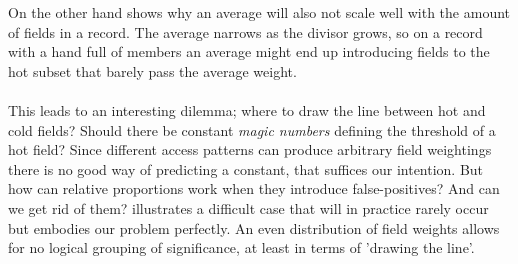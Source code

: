 On the other hand  shows why an average will also not scale well with the amount of fields in a record. The average narrows as the divisor grows, so on a record with a hand full of members an average might end up introducing fields to the hot subset that barely pass the average weight.\\\\
This leads to an interesting dilemma; where to draw the line between hot and cold fields? Should there be constant \textit{magic numbers} defining the threshold of a hot field? Since different access patterns can produce arbitrary field weightings there is no good way of predicting a constant, that suffices our intention. But how can relative proportions work when they introduce false-positives? And can we get rid of them?  illustrates a difficult case that will in practice rarely occur but embodies our problem perfectly. An even distribution of field weights allows for no logical grouping of significance, at least in terms of 'drawing the line'.
